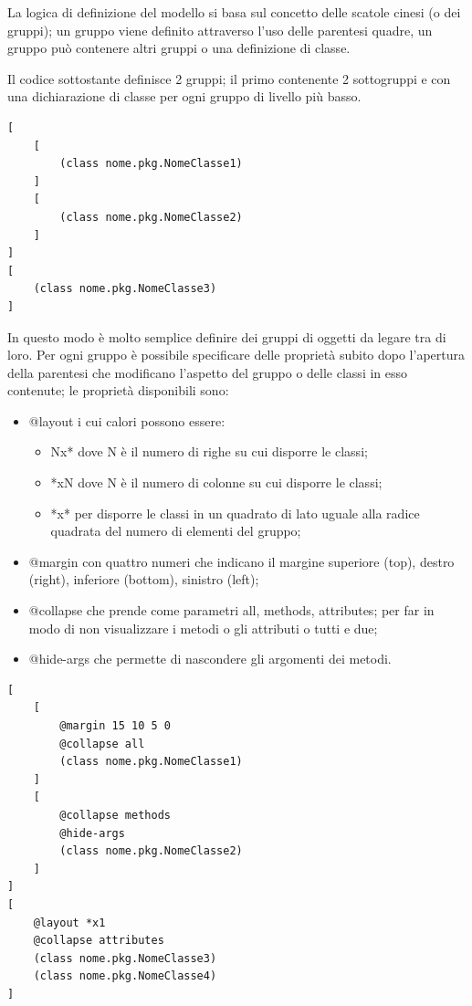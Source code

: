 La logica di definizione del modello si basa sul concetto delle scatole cinesi (o
dei gruppi); un gruppo viene definito attraverso l'uso delle parentesi quadre,
un gruppo può contenere altri gruppi o una definizione di classe.

Il codice sottostante definisce 2 gruppi; il primo contenente 2 sottogruppi e
 con una dichiarazione di classe per ogni gruppo di livello più basso.

\begin{lstlisting}[caption={Un semplice diagramma}, style={layout}] 
[
	[
		(class nome.pkg.NomeClasse1)
	]
	[
		(class nome.pkg.NomeClasse2)
	]
]
[
	(class nome.pkg.NomeClasse3)
]
\end{lstlisting}

In questo modo è molto semplice definire dei gruppi di oggetti da legare tra di
loro. Per ogni gruppo è possibile specificare delle proprietà subito dopo
l'apertura della parentesi che modificano l'aspetto del gruppo o delle classi in
esso contenute; le proprietà disponibili sono:

\begin{itemize}
  \item @layout i cui calori possono essere:
  \begin{itemize}
  	\item Nx* dove N è il numero di righe su cui disporre le classi;
  	\item *xN dove N è il numero di colonne su cui disporre le classi;
  	\item *x* per disporre le classi in un quadrato di lato uguale alla radice
  	quadrata del numero di elementi del gruppo;
  \end{itemize}
  
  \item @margin con quattro numeri che indicano il margine superiore (top),
  destro (right), inferiore (bottom), sinistro (left);
  \item @collapse che prende come parametri all, methods, attributes; per far in
  modo di non visualizzare i metodi o gli attributi o tutti e due;
  \item @hide-args che permette di nascondere gli argomenti dei metodi.
\end{itemize}

\begin{lstlisting}[caption={Diagramma decorato di attributi}, style={layout}] 
[
	[	
		@margin 15 10 5 0
		@collapse all
		(class nome.pkg.NomeClasse1)
	]
	[
		@collapse methods
		@hide-args
		(class nome.pkg.NomeClasse2)
	]
]
[
	@layout *x1
	@collapse attributes
	(class nome.pkg.NomeClasse3)
	(class nome.pkg.NomeClasse4)
]
\end{lstlisting}


